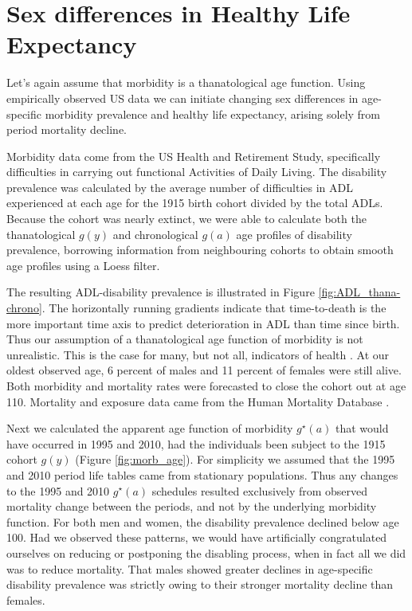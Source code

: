 \documentclass[11pt,oneside,a4paper]{article} %
\begin{document}
\section{Sex differences in Healthy Life Expectancy}

Let's again assume that morbidity is a thanatological age function. Using empirically observed US data we can initiate changing sex differences in age-specific morbidity prevalence and healthy life expectancy, arising solely from period mortality decline.

Morbidity data come from the US Health and Retirement Study, specifically difficulties in carrying out functional Activities of Daily Living. The disability prevalence was calculated by the average number of difficulties in ADL experienced at each age for the 1915 birth cohort divided by the total ADLs. Because the cohort was nearly extinct, we were able to calculate both the thanatological $g(y)$ and chronological $g(a)$ age profiles of disability prevalence, borrowing information from neighbouring cohorts to obtain smooth age profiles using a Loess filter. 

The resulting ADL-disability prevalence is illustrated in Figure \ref{fig:ADL_thana-chrono}. The horizontally running gradients indicate that time-to-death is the more important time axis to predict deterioration in ADL than time since birth. Thus our assumption of a thanatological age function of morbidity is not unrealistic. This is the case for many, but not all, indicators of health \citep{Riffe2015}. At our oldest observed age, 6 percent of males and 11 percent of females were still alive. Both morbidity and mortality rates were forecasted to close the cohort out at age 110.  Mortality and exposure data came from the Human Mortality Database \citep{HMD2015}. 

Next we calculated the apparent age function of morbidity $g^\star(a)$ that would have occurred in 1995 and 2010, had the individuals been subject to the 1915 cohort $g(y)$ (Figure \ref{fig:morb_age}). For simplicity we assumed that the 1995 and 2010 period life tables came from stationary populations. Thus any changes to the 1995 and 2010 $g^\star(a)$ schedules resulted exclusively from observed mortality change between the periods, and not by the underlying morbidity function. For both men and women, the disability prevalence declined below age 100. Had we observed these patterns, we would have artificially congratulated ourselves on reducing or postponing the disabling process, when in fact all we did was to reduce mortality. That males showed greater declines in age-specific disability prevalence was strictly owing to their stronger mortality decline than females.
\end{document}
